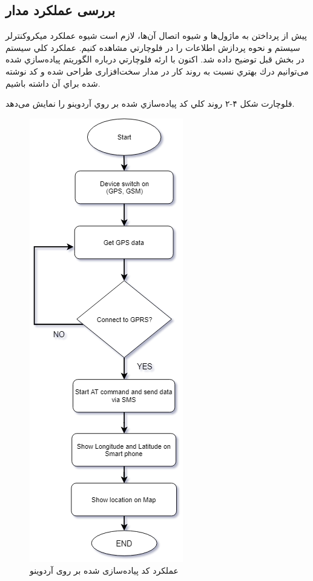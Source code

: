 \subsection{بررسی عملکرد مدار}
پيش از پرداختن به ماژول‌ها و شيوه اتصال آن‌ها، لازم است شيوه عملكرد ميكروكنترلر سيستم و نحوه پردازش اطلاعات را در فلوچارتي مشاهده كنيم. عملكرد كلي سيستم در بخش قبل توضيح داده شد. اكنون با ارئه فلوچارتي درباره الگوريتم پياده‌سازي شده می‌توانیم درك بهتري نسبت به روند كار در مدار سخت‌افزاری طراحی شده و كد نوشته شده براي آن داشته باشيم.

\newpage
فلوچارت شكل ۴-۲ روند كلي كد پياده‌سازي شده بر روي آردوینو را نمايش می‌دهد.
\begin{figure}[h!]
	\centering
	\includegraphics[width=.4\textwidth]{tracking-flowchart}
	\caption{عملکرد کد پیاده‌سازی شده بر روی آردوینو \cite{Rahman2016,Alshamsi,Hazza}}
\end{figure}
\\


